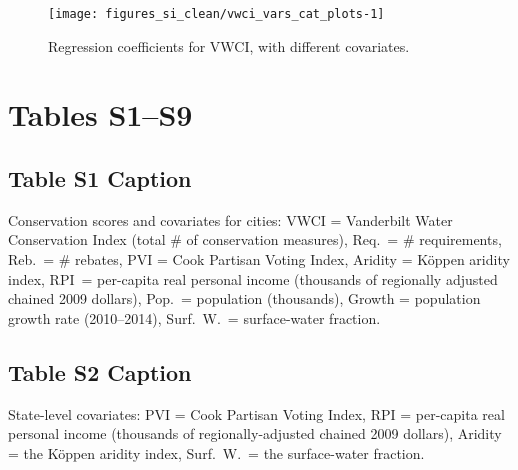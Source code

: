 \documentclass[draft]{agujournal}
\begin{document}

\begin{figure}
\texttt{[image: figures\_si\_clean/vwci\_vars\_cat\_plots-1]} \caption[Regression coefficients for VWCI, with different covariates]{Regression coefficients for VWCI, with different covariates.}\label{fig:vwci_vars_cat_plots}
\end{figure}




\clearpage
\section{Tables S1--S9}
\subsection*{Table S1 Caption}
\begin{table}[H]
\centering
\caption{Conservation scores and covariates for  cities: VWCI = Vanderbilt Water Conservation Index (total \# of conservation measures), Req.\ = \# requirements, Reb.\ = \# rebates, PVI = Cook Partisan Voting Index, Aridity = K\"oppen aridity index, RPI\ = per-capita real personal income (thousands of regionally adjusted chained 2009 dollars), Pop.\ = population (thousands), Growth = population growth rate (2010--2014), Surf.\ W.\ = surface-water fraction.}
\label{tab:vwci}
\end{table}

\subsection*{Table S2 Caption}
\begin{table}[H]
\centering
\caption{State-level covariates: PVI = Cook Partisan Voting Index, RPI = per-capita real personal income (thousands of regionally-adjusted chained 2009 dollars), Aridity = the K\"oppen aridity index, Surf.\ W.\ = the surface-water fraction.}
\label{tab:state}
\end{table}
\end{document}
